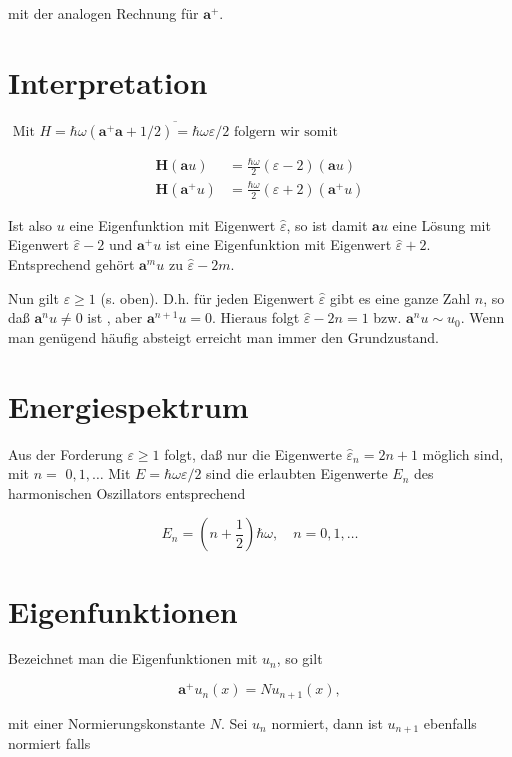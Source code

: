 \documentclass[10pt, letterpaper]{article}
\begin{document}
mit der analogen Rechnung für $\mathbf{a}^{+}$.

\section*{Interpretation}
$\overline{\text { Mit } H=\hbar \omega\left(\mathbf{a}^{+} \mathbf{a}+1 / 2\right)=\hbar \omega \varepsilon / 2 \text { folgern wir somit }}$

$$
\begin{aligned}
\mathbf{H}(\mathbf{a} u) & =\frac{\hbar \omega}{2}(\varepsilon-2)(\mathbf{a} u) \\
\mathbf{H}\left(\mathbf{a}^{+} u\right) & =\frac{\hbar \omega}{2}(\varepsilon+2)\left(\mathbf{a}^{+} u\right)
\end{aligned}
$$

Ist also $u$ eine Eigenfunktion mit Eigenwert $\widehat{\varepsilon}$, so ist damit $\mathbf{a} u$ eine Lösung mit Eigenwert $\widehat{\varepsilon}-2$ und $\mathbf{a}^{+} u$ ist eine Eigenfunktion mit Eigenwert $\widehat{\varepsilon}+2$. Entsprechend gehört $\mathbf{a}^{m} u$ zu $\widehat{\varepsilon}-2 m$.

Nun gilt $\varepsilon \geq 1$ (s. oben). D.h. für jeden Eigenwert $\widehat{\varepsilon}$ gibt es eine ganze Zahl $n$, so daß $\mathbf{a}^{n} u \neq 0$ ist , aber $\mathbf{a}^{n+1} u=0$. Hieraus folgt $\widehat{\varepsilon}-2 n=1$ bzw. $\mathbf{a}^{n} u \sim u_{0}$. Wenn man genügend häufig absteigt erreicht man immer den Grundzustand.

\section*{Energiespektrum}
Aus der Forderung $\varepsilon \geq 1$ folgt, daß nur die Eigenwerte $\widehat{\varepsilon}_{n}=2 n+1$ möglich sind, mit $n=$ $0,1, \ldots$ Mit $E=\hbar \omega \varepsilon / 2$ sind die erlaubten Eigenwerte $E_{n}$ des harmonischen Oszillators entsprechend

$$
E_{n}=\left(n+\frac{1}{2}\right) \hbar \omega, \quad n=0,1, \ldots
$$

\section*{Eigenfunktionen}
Bezeichnet man die Eigenfunktionen mit $u_{n}$, so gilt

$$
\mathbf{a}^{+} u_{n}(x)=N u_{n+1}(x),
$$

mit einer Normierungskonstante $N$. Sei $u_{n}$ normiert, dann ist $u_{n+1}$ ebenfalls normiert falls
\end{document}
